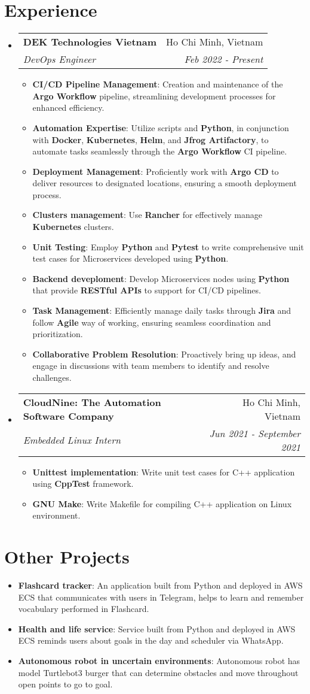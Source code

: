 \documentclass[11pt,a4paper,sans]{moderncv}
\makeatletter
\newcommand{\resumeItem}[2]{
  \item\small{
    \textbf{#1}{: #2 \vspace{-2pt}}
  }
}
\newcommand{\resumeSubheading}[4]{
  \vspace{-1pt}\item
    \begin{tabular*}{0.97\textwidth}{l@{\extracolsep{\fill}}r}
      \textbf{#1} & #2 \\
      \textit{\small#3} & \textit{\small #4} \\
    \end{tabular*}\vspace{-5pt}
}
\newcommand{\resumeSubItem}[2]{\resumeItem{#1}{#2}\vspace{-4pt}}
\newcommand{\resumeSubHeadingListStart}{\begin{itemize}[leftmargin=*]}
\newcommand{\resumeSubHeadingListEnd}{\end{itemize}}
\newcommand{\resumeItemListStart}{\begin{itemize}}
\newcommand{\resumeItemListEnd}{\end{itemize}\vspace{-4pt}}
\makeatother
\begin{document}
\section{Experience}
  \resumeSubHeadingListStart
    \resumeSubheading
      {DEK Technologies Vietnam}{Ho Chi Minh, Vietnam}
      {DevOps Engineer}{Feb 2022 - Present}
      \resumeItemListStart
        \resumeItem{CI/CD Pipeline Management}
          {Creation and maintenance of the \textbf{Argo Workflow} pipeline, streamlining development processes for enhanced efficiency.}
        \resumeItem{Automation Expertise}
          {Utilize \textbf{} scripts and \textbf{Python}, in conjunction with \textbf{Docker}, \textbf{Kubernetes}, \textbf{Helm}, and \textbf{Jfrog Artifactory}, to automate tasks seamlessly through the \textbf{Argo Workflow} CI pipeline.}
        \resumeItem{Deployment Management}
          {Proficiently work with \textbf{Argo CD} to deliver resources to designated locations, ensuring a smooth deployment process.}
        \resumeItem{Clusters management}
          {Use \textbf{Rancher} for effectively manage \textbf{Kubernetes} clusters.}
        \resumeItem{Unit Testing}
          {Employ \textbf{Python} and \textbf{Pytest} to write comprehensive unit test cases for Microservices developed using \textbf{Python}.}
        \resumeItem{Backend deveploment}
          {Develop Microservices nodes using \textbf{Python} that provide \textbf{RESTful APIs} to support for CI/CD pipelines.}
        \resumeItem{Task Management}
          {Efficiently manage daily tasks through \textbf{Jira} and follow \textbf{Agile} way of working, ensuring seamless coordination and prioritization.}
        \resumeItem{Collaborative Problem Resolution}
          {Proactively bring up ideas, and engage in discussions with team members to identify and resolve challenges.}
      \resumeItemListEnd

    \resumeSubheading
      {CloudNine: The Automation Software Company}{Ho Chi Minh, Vietnam}
      {Embedded Linux Intern}{Jun 2021 - September 2021}
      \resumeItemListStart
        \resumeItem{Unittest implementation}
          {Write unit test cases for C++ application using \textbf{CppTest} framework.}
        \resumeItem{GNU Make}
          {Write Makefile for compiling C++ application on Linux environment.}
      \resumeItemListEnd

  \resumeSubHeadingListEnd

\section{Other Projects}
  \resumeSubHeadingListStart
    \resumeSubItem{Flashcard tracker}
      {An application built from Python and deployed in AWS ECS  that communicates with users in Telegram, helps to learn and remember vocabulary performed in Flashcard.}
    \resumeSubItem{Health and life service}
      {Service built from Python and deployed in AWS ECS reminds users about goals in the day and scheduler via WhatsApp.}
    \resumeSubItem{Autonomous robot in uncertain environments}
      {Autonomous robot has model Turtlebot3 burger that can determine obstacles and move throughout open points to go to goal.}
  \resumeSubHeadingListEnd
\end{document}
